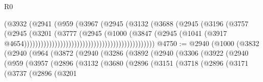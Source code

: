 \begin{lexlean}{R0}
\begin{coremodule}
                                                            (@3932
                                                              (@2941
                                                                (@959
                                                                  (@3967
                                                                    (@2945
                                                                      (@3132
                                                                        (@3688
                                                                          (@2945
                                                                            (@3196
                                                                              (@3757
                                                                                (@2945
                                                                                  (@3201
                                                                                    (@3777
                                                                                      (@2945
                                                                                        (@1000
                                                                                          (@3847
                                                                                            (@2945
                                                                                              (@1041
                                                                                                (@3917
                                                                                                  @4654)))))))))))))))))))))))))))))))))))))))))))))))
@4750 := @2940
    (@1000
      (@3832
        (@2940
          (@964
            (@3872
              (@2940
                (@3286
                  (@3892
                    (@2940
                      (@3306
                        (@3922
                          (@2940
                            (@959
                              (@3957
                                (@2896
                                  (@3132
                                    (@3680
                                      (@2896
                                        (@3151
                                          (@3718
                                            (@2896
                                              (@3171
                                                (@3737
                                                  (@2896
                                                    (@3201

\end{coremodule}
\end{lexlean}
